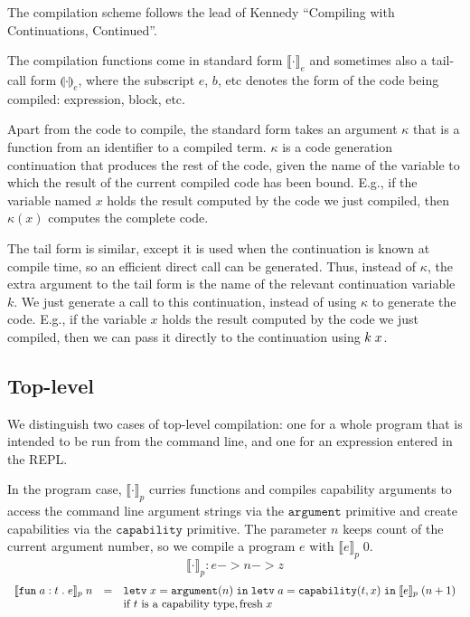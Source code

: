 \documentclass[11pt]{article}
\newcommand{\kw}[1]{\mathtt{#1}}
\begin{document}
\newcommand{\cmp}[2]{\llbracket #2 \rrbracket_#1}
\newcommand{\cmpn}[1]{\cmp{#1}{\cdot}}
\newcommand{\cmpin}[3]{\cmp{#1}{#2}\;#3}
\newcommand{\cmpk}[2]{\cmp{#1}{#2}\;\kappa}

\newcommand{\tcmp}[2]{\llparenthesis #2 \rrparenthesis_#1}
\newcommand{\tcmpn}[1]{\tcmp{#1}{\cdot}}
\newcommand{\tcmpin}[3]{\tcmp{#1}{#2}\;#3}
\newcommand{\tcmpk}[2]{\tcmp{#1}{#2}\;k}

The compilation scheme follows the lead of Kennedy ``Compiling with Continuations, Continued''.

The compilation functions come in standard form $\cmpn{e}$ and sometimes also a tail-call form $\tcmpn{e}$, where the subscript $e$, $b$, etc denotes the form of the code being compiled: expression, block, etc.

Apart from the code to compile, the standard form takes an argument $\kappa$ that is a function from an identifier to a compiled term.
$\kappa$ is a code generation continuation that produces the rest of the code, given the name of the variable to which the result of the current compiled code has been bound.
E.g., if the variable named $x$ holds the result computed by the code we just compiled, then $\kappa(x)$ computes the complete code.

The tail form is similar, except it is used when the continuation is known at compile time, so an efficient direct call can be generated.
Thus, instead of $\kappa$, the extra argument to the tail form is the name of the relevant continuation variable $k$.
We just generate a call to this continuation, instead of using $\kappa$ to generate the code.
E.g., if the variable $x$ holds the result computed by the code we just compiled, then we can pass it directly to the continuation using $k\;x$.

\subsection*{Top-level}

We distinguish two cases of top-level compilation: one for a whole program that is intended to be run from the command line, and one for an expression entered in the REPL.

In the program case, $\cmpn{p}$ curries functions and compiles capability arguments to access the command line argument strings via the $\kw{argument}$ primitive and create capabilities via the $\kw{capability}$ primitive.
The parameter $n$ keeps count of the current argument number, so we compile a program $e$ with $\cmpin{p}{e}{0}$.
\[
    \cmpn{p} : e -> n -> z
\]
\[
\begin{array}{rcll}
\cmpin{p}{\fune{\arge{a}{t}}{e}}{n} & = &
  \letv{x}{\prmv{\kw{argument}}{n}}{\letv{a}{\prmv{\kw{capability}}{t,x}}{\cmpin{p}{e}{(n + 1)}}} \\
  & &
  \text{if $t$ is a capability type}, \fresh{x} \\
\end{array}
\]
\end{document}
